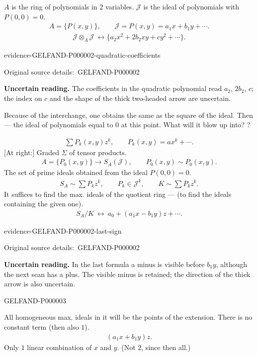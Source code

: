 \documentclass[11pt]{article}
\newcommand{\SourcePage}[2]{\par\smallskip\phantomsection\label{#1:source-page}{\small\sffamily\color{blue!55!black}#1}\par\smallskip}
\newcommand{\EvidenceBlock}[4]{%
 \par\smallskip\noindent\begin{minipage}{\linewidth}
 \begin{minipage}[t]{.47\linewidth}\vspace{0pt}\centering
 \csname evidence-#1-#2\endcsname\par
 {\scriptsize\SourceCropCaption\ #1}\par
 \end{minipage}\hfill
 \begin{minipage}[t]{.49\linewidth}\vspace{0pt}\raggedright
 {\small\color{orange!65!black}\textbf{#4} #3}\par
 \end{minipage}
 \end{minipage}\par\smallskip}
\newcommand{\Unclear}[3]{\EvidenceBlock{#1}{#2}{#3}{\ReadingCaption}}
\newcommand{\SourceCropCaption}{Original source details:}\newcommand{\ReadingCaption}{Uncertain reading.}\newcommand{\IncompleteCaption}{Undeciphered passage.}\newcommand{\DiagramCaption}{Diagram and typed description.}
\begin{document}
$A$ is the ring of polynomials in $2$ variables.
$\mathcal{J}$ is the ideal of polynomials with $P(0,0)=0$.
\begin{gather*}
 A=\{P(x,y)\},\qquad
 \mathcal{J}=P(x,y)=a_1x+b_1y+\cdots .
\end{gather*}
\begin{gather*}
 \mathcal{J}\otimes_A\mathcal{J}\ \longleftrightarrow
 \{a_2x^2+2b_2xy+cy^2+\cdots\}.
\end{gather*}
\Unclear{GELFAND-P000002}{quadratic-coefficients}{The coefficients in the quadratic polynomial read $a_2$, $2b_2$, $c$; the index on $c$ and the shape of the thick two-headed arrow are uncertain.}

Because of the interchange, one obtains the same as the square of the ideal.
Then --- the ideal of polynomials equal to $0$ at this point.
What will it blow up into? ?

\begin{gather*}
 \sum P_k(x,y)z^k,\qquad P_k(x,y)=ax^k+\cdots .
\end{gather*}
[At right:] Graded $\Sigma$ of tensor products.
\begin{gather*}
 A=\{P_0(x,y)\}\longrightarrow S_A(\mathcal{J}),\qquad
 P_0(x,y)\sim P_0(x,y).
\end{gather*}
The set of prime ideals obtained from the ideal $P(0,0)=0$.
\begin{gather*}
 S_A\sim\sum P_kz^k,\qquad P_k\in\mathcal{J}^k,\qquad
 K\sim\sum P_kz^k.
\end{gather*}
It suffices to find the max. ideals of the quotient ring ---
(to find the ideals containing the given one).
\begin{gather*}
 S_A/K\ \longleftrightarrow\ a_0+(a_1x-b_1y)z+\cdots .
\end{gather*}
\Unclear{GELFAND-P000002}{last-sign}{In the last formula a minus is visible before $b_1y$, although the next scan has a plus. The visible minus is retained; the direction of the thick arrow is also uncertain.}

\SourcePage{GELFAND-P000003}{2}
All homogeneous max. ideals in it will be the points of the extension.
There is no constant term (then also $1$).
\begin{gather*}
 (a_1x+b_1y)z.
\end{gather*}
Only $1$ linear combination of $x$ and $y$.
(Not $2$, since then all.)
\end{document}
